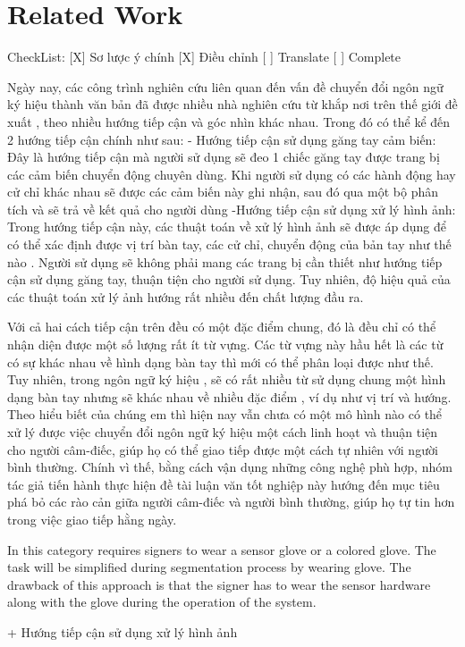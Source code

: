 \chapter{Related Work}
  CheckList: 
    [X] Sơ lược ý chính
    [X] Điều chỉnh
    [ ] Translate
    [ ] Complete


  Ngày nay, các công trình nghiên cứu liên quan đến vấn đề chuyển đổi ngôn ngữ
  ký hiệu thành văn bản đã được nhiều nhà nghiên cứu từ khắp nơi trên thế giới đề xuất
  , theo nhiều hướng tiếp cận và góc nhìn khác nhau. Trong đó có thể kể đến 2 hướng
  tiếp cận chính như sau:
    - Hướng tiếp cận sử dụng găng tay cảm biến:
        Đây là hướng tiếp cận mà người sử dụng sẽ đeo 1 chiếc găng tay được trang bị
        các cảm biến chuyển động chuyên dùng. Khi người sử dụng có các hành động hay
        cử chỉ khác nhau sẽ được các cảm biến này ghi nhận, sau đó qua một bộ phân
        tích và sẽ trả về kết quả cho người dùng
    -Hướng tiếp cận sử dụng xử lý hình ảnh:
        Trong hướng tiếp cận này, các thuật toán về xử lý hình ảnh sẽ được áp dụng để
        có thể xác định được vị trí bàn tay, các cử chỉ, chuyển động của bản tay như thế nào
        . Người sử dụng sẽ không phải mang các trang bị cần thiết như hướng tiếp cận sử 
        dụng găng tay, thuận tiện cho người sử dụng. Tuy nhiên,
        độ hiệu quả của các thuật toán xử lý ảnh hướng rất nhiều đến chất lượng đầu ra.

  Với cả hai cách tiếp cận trên đều có một đặc điểm chung, đó là đều chỉ có thể
  nhận diện được một số lượng rất ít từ vựng. Các từ vựng này hầu hết là các từ có sự khác nhau
  về hình dạng bàn tay thì mới có thể phân loại được như thế. Tuy nhiên, trong ngôn ngữ ký hiệu
  , sẽ có rất nhiều từ sử dụng chung một hình dạng bàn tay nhưng sẽ khác nhau về nhiều đặc điểm
  , ví dụ như vị trí và hướng. Theo hiểu biết của chúng em thì hiện nay vẫn chưa có một mô hình nào
  có thể xử lý được việc chuyển đổi ngôn ngữ ký hiệu một cách linh hoạt và thuận tiện cho người câm-điếc,
  giúp họ có thể giao tiếp được một cách tự nhiên với người bình thường. Chính vì thế, bằng cách vận dụng những công nghệ
  phù hợp, nhóm tác giả tiến hành thực hiện đề tài luận văn tốt nghiệp này hướng đến mục tiêu phá bỏ các rào cản
  giữa người câm-điếc và người bình thường, giúp họ tự tin hơn trong việc giao tiếp hằng ngày.



In this category requires signers to wear a sensor glove or a
colored glove. The task will be simplified during
segmentation process by wearing glove. The drawback of this
approach is that the signer has to wear the sensor hardware
along with the glove during the operation of the system.

    + Hướng tiếp cận sử dụng xử lý hình ảnh
